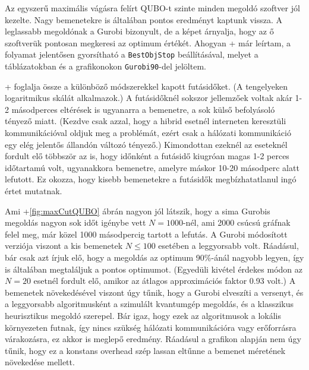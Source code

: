 Az egyszerű maximális vágásra felírt QUBO-t szinte minden megoldó szoftver jól kezelte. Nagy bemenetekre is általában pontos eredményt kaptunk vissza. A leglassabb megoldónak a Gurobi bizonyult, de a képet árnyalja, hogy az ő szoftverük pontosan megkeresi az optimum értékét. Ahogyan \az+ már leírtam, a folyamat jelentősen gyorsítható a \verb+BestObjStop+ beállításával, melyet a táblázatokban és a grafikonokon \verb+Gurobi90+-del jelöltem.

\Az+ foglalja össze a különböző módszerekkel kapott futásidőket. (A tengelyeken logaritmikus skálát alkalmazok.) A futásidőknél sokszor jellemzőek voltak akár 1-2 másodperces eltérések is ugyanarra a bemenetre, a sok külső befolyásoló tényező miatt. (Kezdve csak azzal, hogy a hibrid esetnél interneten keresztüli kommunikációval oldjuk meg a problémát, ezért csak a hálózati kommunikáció egy elég jelentős állandón változó tényező.) Kimondottan ezeknél az eseteknél fordult elő többször az is, hogy időnként a futásidő kiugróan magas 1-2 perces időtartamú volt, ugyanakkora bemenetre, amelyre máskor 10-20 másodperc alatt lefutott. Ez okozza, hogy kisebb bemenetekre a futásidők megbízhatatlanul ingó értet mutatnak.




Ami \az+\ref{fig:maxCutQUBO} ábrán nagyon jól látszik, hogy a sima Gurobis megoldás nagyon sok időt igénybe vett $N=1000$-nél, ami 2000 csúcsú gráfnak felel meg, már közel 1000 másodpercig tartott a lefutás. A Gurobi módosított verziója viszont a kis bemenetek $N \leq 100$ esetében a leggyorsabb volt. Ráadásul, bár csak azt írjuk elő, hogy a megoldás az optimum 90\%-ánál nagyobb legyen, így is általában megtaláljuk a pontos optimumot. (Egyedüli kivétel érdekes módon az $N=20$ esetnél fordult elő, amikor az átlagos approximációs faktor 0.93 volt.)
A bemenetek növekedésével viszont úgy tűnik, hogy a Gurobi elveszíti a versenyt, és a leggyorsabb algoritmusként a szimulált kvantumgép megoldás, és a klasszikus heurisztikus megoldó szerepel. Bár igaz, hogy ezek az algoritmusok a lokális környezeten futnak, így nincs szükség hálózati kommunikációra vagy erőforrásra várakozásra, ez akkor is meglepő eredmény. Ráadásul a grafikon alapján nem úgy tűnik, hogy ez a konstans overhead szép lassan eltűnne a bemenet méretének növekedése mellett.


